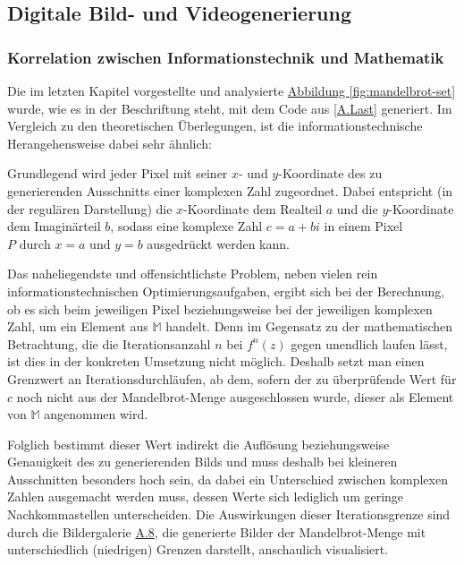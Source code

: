 \subsection{Digitale Bild- und Videogenerierung}\label{subsec:digital-generation}

\subsubsection{Korrelation zwischen Informationstechnik und Mathematik}
\label{subsubsec:correlation-between-it-and-mathematics}

Die im letzten Kapitel vorgestellte und analysierte \hyperref[fig:mandelbrot-set]
{Abbildung \ref{fig:mandelbrot-set}} wurde,
wie es in der Beschriftung steht, mit dem Code aus \hyperref[app:last]{[A.Last]}
generiert.
Im Vergleich zu den theoretischen Überlegungen, ist die
informationstechnische Herangehensweise dabei sehr ähnlich:

Grundlegend wird jeder Pixel mit seiner $x$- und $y$-Koordinate des zu generierenden
Ausschnitts einer komplexen Zahl zugeordnet.
Dabei entspricht (in der regulären Darstellung) die $x$-Koordinate dem Realteil
$a$ und die $y$-Koordinate dem Imagin\"arteil $b$, sodass eine komplexe Zahl
$c = a + bi$ in einem Pixel $P \text{ durch } x = a \text{ und } y = b$ ausgedrückt
werden kann.

Das naheliegendste und offensichtlichste Problem,
neben vielen rein informationstechnischen Optimierungsaufgaben,
ergibt sich bei der Berechnung, ob es sich beim jeweiligen Pixel
beziehungsweise bei der jeweiligen komplexen Zahl, um ein Element aus
$\mathbb{M}$ handelt.
Denn im Gegensatz zu der mathematischen Betrachtung, die die Iterationsanzahl
$n$ bei $f^n(z)$ gegen unendlich laufen lässt, ist dies in der konkreten Umsetzung
nicht möglich.
Deshalb setzt man einen Grenzwert an Iterationsdurchläufen, ab dem, sofern der zu
überprüfende Wert für $c$ noch nicht aus der Mandelbrot-Menge ausgeschlossen wurde,
dieser als Element von $\mathbb{M}$ angenommen wird.

Folglich bestimmt dieser Wert indirekt die Auflösung beziehungsweise Genauigkeit
des zu generierenden Bilds und muss deshalb bei kleineren Ausschnitten besonders
hoch sein, da dabei ein Unterschied zwischen komplexen Zahlen ausgemacht werden
muss, dessen Werte sich lediglich um geringe Nachkommastellen unterscheiden.
Die Auswirkungen dieser Iterationsgrenze sind durch die Bildergalerie
\hyperref[app:8]{A.8}, die generierte Bilder der Mandelbrot-Menge
mit unterschiedlich (niedrigen) Grenzen darstellt, anschaulich visualisiert.